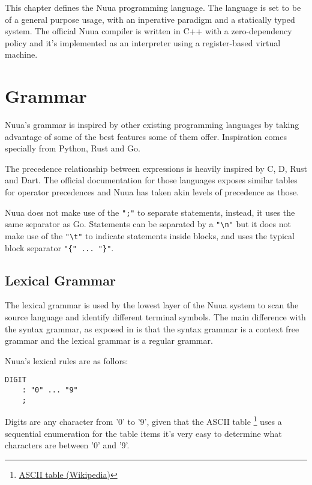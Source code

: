 This chapter defines the Nuua programming language. The language is set to be of a general purpose usage, with an inperative
paradigm and a statically typed system. The official Nuua compiler is written in C++ with a zero-dependency policy and it's
implemented as an interpreter using a register-based virtual machine.

\section{Grammar}

Nuua's grammar is inspired by other existing programming languages by taking advantage of some of the best features some of them offer.
Inspiration comes specially from Python, Rust and Go.

The precedence relationship between expressions is heavily inspired by C, D, Rust and Dart. The official documentation for those languages
exposes similar tables for operator precedences and Nuua has taken akin levels of precedence as those.

Nuua does not make use of the \texttt{";"} to separate statements, instead, it uses the same separator as Go. Statements can be separated by
a \texttt{"\textbackslash n"} but it does not make use of the \texttt{"\textbackslash t"} to indicate statements inside blocks, and uses the typical
block separator \texttt{"\{" ... "\}"}.

\subsection{Lexical Grammar}

The lexical grammar is used by the lowest layer of the Nuua system to scan the source language and identify different terminal symbols.
The main difference with the syntax grammar, as exposed in \autocite[Appendix~I]{crafting_interpreters} is that the syntax grammar is a
context free grammar and the lexical grammar is a regular grammar.

Nuua's lexical rules are as follors:

\begin{lstlisting}
DIGIT
    : "0" ... "9"
    ;
\end{lstlisting}

Digits are any character from '0' to '9', given that the ASCII table \footnote{\href{https://en.wikipedia.org/wiki/ASCII}{ASCII table (Wikipedia)}} uses
a sequential enumeration for the table items it's very easy to determine what characters are between '0' and '9'.

